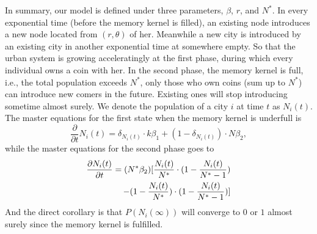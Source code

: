 \documentclass[reprint,unsortedaddress,amsmath,amssymb,aps,prl,showkeys]{revtex4-2}
\begin{document}
In summary, our model is defined under three parameters, $\beta$, $r$, and $N^*$. In every exponential time (before the memory kernel is filled), an existing node introduces a new node located from $(r,\theta)$ of her. Meanwhile a new city is introduced by an existing city in another exponential time at somewhere empty. So that the urban system is growing acceleratingly at the first phase, during which every individual owns a coin with her. In the second phase, the memory kernel is full, i.e., the total population exceeds $N^*$, only those who own coins (sum up to $N^*$) can introduce new comers in the future. Existing ones will stop introducing sometime almost surely. We denote the population of a city $i$ at time $t$ as $N_i(t)$. The master equations for the first state when the memory kernel is underfull is \[\frac{\partial}{\partial t}N_i(t) =  \delta_{N_i(t)}\cdot k\beta_1+ (1-\delta_{N_i(t)})\cdot N\beta_2, \]while the master equations for the second phase goes to
\begin{align}
    \frac{\partial N_i(t)}{\partial t}  = (N^*\beta_2)[\frac{N_i(t)}{N^*}\cdot(1-\frac{N_i(t)}{N^*-1})& \notag\\  - (1-\frac{N_i(t)}{N^*})\cdot (1-\frac{N_i(t)}{N^*-1}) ]&
\end{align}
And the direct corollary is that $P(N_i(\infty))$ will converge to $0$ or $1$ almost surely since the memory kernel is fulfilled. 
\end{document}
